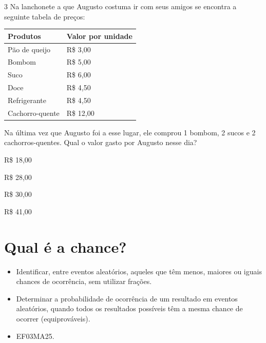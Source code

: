 \num{3} Na lanchonete a que Augusto costuma ir com seus amigos se encontra a
seguinte tabela de preços:

\begin{longtable}[]{@{}ll@{}}
\toprule
Produtos & Valor por unidade\tabularnewline
\midrule
\endhead
Pão de queijo & R\$ 3,00\tabularnewline
Bombom & R\$ 5,00\tabularnewline
Suco & R\$ 6,00\tabularnewline
Doce & R\$ 4,50\tabularnewline
Refrigerante & R\$ 4,50\tabularnewline
Cachorro-quente & R\$ 12,00\tabularnewline
\bottomrule
\end{longtable}

Na última vez que Augusto foi a esse lugar, ele comprou 1 bombom, 2
sucos e 2 cachorros-quentes. Qual o valor gasto por Augusto nesse dia?

\begin{escolha}

\item
  R\$ 18,00
\item
  R\$ 28,00
\item
  R\$ 30,00
\item
  R\$ 41,00
\end{escolha}

\chapter{Qual é a chance?}


\begin{itemize}
\item Identificar, entre eventos aleatórios, aqueles que têm menos, maiores ou
iguais chances de ocorrência, sem utilizar frações.

\item Determinar a probabilidade de ocorrência de um resultado em eventos
aleatórios, quando todos os resultados possíveis têm a mesma chance de
ocorrer (equiprováveis).
\end{itemize}


\begin{itemize}
  \item 
 EF03MA25.
\end{itemize}


